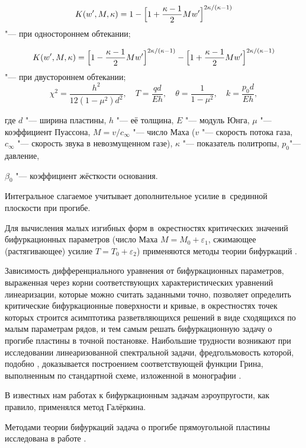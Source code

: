 $$

K(w',M, \kappa)=1-\Bigl[1+ \frac{\kappa-1}{2}M w'\Bigr]^{{2\kappa}/({\kappa-1})}

$$ "--- при одностороннем обтекании; 

$$

K(w',M,\kappa)= \Bigl[1-\frac{\kappa-1}{2}M w'\Bigr]^{{2\kappa}/({\kappa-1})}-

\Bigl[1+\frac{\kappa-1}{2}M   w'\Bigr]^{{2\kappa}/({\kappa-1})}$$ "--- при двустороннем обтекании;  $$\chi^{2}=\frac{h^{2}}{12(1-\mu^{2})d^{2}},\quad 

T=\frac{qd}{Eh},\quad \theta=\frac{1}{1-\mu^2}, \quad k=\frac{p_{0}d}{Eh},$$ 

где $d$ "--- ширина пластины, $h$ "--- её толщина, $E$ "---  модуль Юнга, $\mu$ "--- коэффициент Пуассона, $M={ v }/{c_{\infty}}$ "--- число Маха ($ v $ "--- скорость потока газа, $c_{\infty}$ "--- скорость звука в невозмущенном газе), $\kappa$ "--- показатель политропы, $p_0$"---давление,

$\beta_0$ "--- коэффициент жёсткости основания. 

Интегральное слагаемое учитывает дополнительное усилие в~срединной плоскости при прогибе.



Для вычисления малых изгибных форм в~окрестностях критических значений бифуркационных параметров (число Маха $M=M_0+\varepsilon_1$, сжимающее (растягивающее) усилие $T=T_0+\varepsilon_2$) применяются методы теории бифуркаций \cite{badokinate:bib:VAT}. 

Зависимость дифференциального уравнения от бифуркационных параметров, выраженная через корни соответствующих характеристических уравнений линеаризации, которые можно считать заданными точно, позволяет определить критические бифуркационные поверхности и кривые, в окрестностях точек которых строится асимптотика разветвляющихся решений в виде сходящихся по малым параметрам рядов, и тем самым решать бифуркационную задачу о прогибе пластины в точной постановке. Наибольшие трудности возникают при исследовании линеаризованной спектральной задачи, фредгольмовость которой, подобно \cite{badokinate:bib:LogBadMak}, доказывается построением соответствующей функции Грина, выполненным по стандартной схеме, изложенной в монографии \cite{badokinate:bib:Naymark}.



В известных нам работах к бифуркационным задачам аэроупругости, как правило, применялся метод Галёркина. 

Методами теории бифуркаций задача о прогибе прямоугольной пластины исследована в работе \cite{badokinate:bib:LoginovKojevnikova}. 


